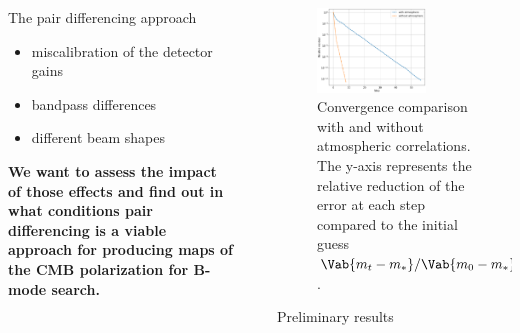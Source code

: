 \documentclass[final]{beamer}
\newlength{\sepwidth}
\newlength{\colwidth}
\newcommand{\separatorcolumn}{\begin{column}{\sepwidth}\end{column}}
\begin{document}
\begin{frame}[t]
\begin{columns}[t]
\begin{column}{\colwidth}
\begin{alertblock}{The pair differencing approach}
        \begin{itemize}
          \item miscalibration of the detector gains
          \item bandpass differences
          \item different beam shapes
        \end{itemize}

      \end{alertblock}

      \textbf{We want to assess the impact of those effects and find out in what conditions pair differencing is a viable approach for producing maps of the CMB polarization for B-mode search.}

    \end{column}

    \separatorcolumn

    \begin{column}{\colwidth}

      \begin{figure}
        \centering
        \includegraphics[width=0.7\textwidth]{figures/convergence.png}
        \caption{Convergence comparison with and without atmospheric correlations. The y-axis represents the relative reduction of the error at each step compared to the initial guess $\Vab{m_t - m_\ast} / \Vab{m_0 - m_\ast}$.}
        \label{fig:convergence}
      \end{figure}

      \begin{block}{Preliminary results}



\end{block}
\end{column}
\end{columns}
\end{frame}
\end{document}
